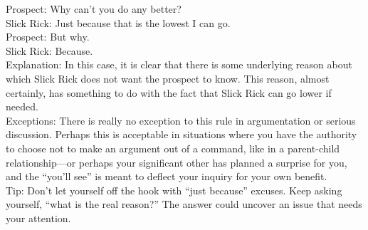 \documentclass[a4paper,12pt,single,pdftex]{scrartcl}
\begin{document}
    
      Prospect: Why can’t you do any better?
    \\

    
      Slick Rick: Just because that is the lowest I can go.
    \\

    
      Prospect: But why.
    \\

    
      Slick Rick: Because.
    \\

    
      Explanation: In this case, it is clear that there is some underlying reason about which Slick Rick does not want the prospect to know.  This reason, almost certainly, has something to do with the fact that Slick Rick can go lower if needed.
    \\

    
      Exceptions: There is really no exception to this rule in argumentation or serious discussion.  Perhaps this is acceptable in situations where you have the authority to choose not to make an argument out of a command, like in a parent-child relationship—or perhaps your significant other has planned a surprise for you, and the “you’ll see” is meant to deflect your inquiry for your own benefit.
    \\

    
      Tip: Don’t let yourself off the hook with “just because” excuses.  Keep asking yourself, “what is the real reason?”  The answer could uncover an issue that needs your attention.
    \\
\end{document}
